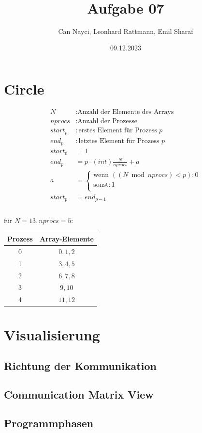 \documentclass[a4paper,10pt]{article}
\title{Aufgabe 07}
\author{Can Nayci, Leonhard Rattmann, Emil Sharaf}
\date{09.12.2023}
\begin{document}
\maketitle

\section{Circle}
\begin{align*}
 N &: \text{Anzahl der Elemente des Arrays} \\
 nprocs &: \text{Anzahl der Prozesse} \\
 start_p &: \text{erstes Element für Prozess } p\\
 end_p &: \text{letztes Element für Prozess } p\\
 start_0 &= 1 \\
 end_p &= p \cdot (int) \frac{N}{nprocs} + a\\
 a &=
 \begin{cases}
    \text{wenn }((N \bmod nprocs) < p) : 0\\
    \text{sonst} : 1\\
 \end{cases}\\
 start_p &= end_{p-1}\\
\end{align*}\\
für $N = 13, nprocs = 5$:
\begin{tabular}{c | c}
 Prozess & Array-Elemente \\
 \hline
 0 & $0,1,2$\\
 1 & $3,4,5$\\
 2 & $6,7,8$\\
 3 & $9,10$\\
 4 & $11,12$\\
\end{tabular}

\section{Visualisierung}
\subsection{Richtung der Kommunikation}
\subsection{Communication Matrix View}
\subsection{Programmphasen}
\end{document}
